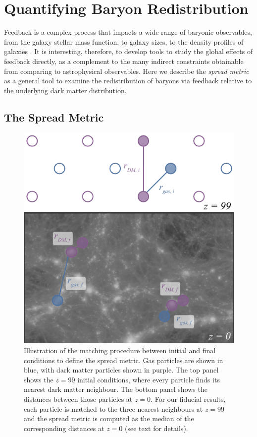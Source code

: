 \section{Quantifying Baryon Redistribution}
\label{sec:feedbackmetrics}

Feedback is a complex process that impacts a wide range of baryonic
observables, from the galaxy stellar mass function, to galaxy sizes, to the
density profiles of galaxies \citep[e.g.][]{Angles-Alcazar2014, Nelson2015,
Hellwing2016, BenitezLlambay2018}. It is interesting, therefore, to develop
tools to study the global effects of feedback directly, as a complement to
the many indirect constraints obtainable from comparing to astrophysical
observables. Here we describe the {\it spread metric} as a general tool to
examine the redistribution of baryons via feedback relative to the underlying
dark matter distribution.

\subsection{The Spread Metric}

\begin{figure}
    \centering
    \includegraphics[width=\columnwidth]{figures/kspafig_small.pdf}
    \vspace{-0.5cm}
    \caption{Illustration of the matching procedure between initial and final
    conditions to define the spread metric. Gas particles are shown in
    blue, with dark matter particles shown in purple. The top panel shows the
    $z=99$ initial conditions, where every particle finds its nearest dark
    matter neighbour. The bottom panel shows the distances between those
    particles at $z=0$. For our fiducial results, each particle is matched to
    the three nearest neighbours at $z=99$ and the spread metric is computed
    as the median of the corresponding distances at $z=0$ (see text for
    details).}
    \label{fig:kspafigsmall}
\end{figure}

